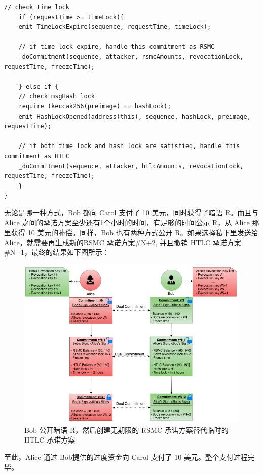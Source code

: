 \begin{lstlisting}[caption={兑现RSMC共同承诺}, label={lst:cashHtlc}]
    // check time lock
    if (requestTime >= timeLock){
    emit TimeLockExpire(sequence, requestTime, timeLock);
    
    // if time lock expire, handle this commitment as RSMC
    _doCommitment(sequence, attacker, rsmcAmounts, revocationLock, requestTime, freezeTime);
    
    } else if {
    // check msgHash lock
    require (keccak256(preimage) == hashLock);
    emit HashLockOpened(address(this), sequence, hashLock, preimage, requestTime);
    
    // if both time lock and hash lock are satisfied, handle this commitment as HTLC
    _doCommitment(sequence, attacker, htlcAmounts, revocationLock, requestTime, freezeTime);
    }
}

\end{lstlisting}

无论是哪一种方式，Bob 都向 Carol 支付了 10 美元，同时获得了暗语 R。而且与Alice 之间的承诺方案至少还有1个小时的时间，有足够的时间公示 R，从 Alice 那里获得 10 美元的补偿。同样，Bob 也有两种方式公开 R。如果选择私下里发送给 Alice，就需要再生成新的RSMC 承诺方案\#N+2, 并且撤销 HTLC 承诺方案\#N+1，最终的结果如下图所示：
\begin{figure}[h!]
    \centering
    \includegraphics[width=12cm, keepaspectratio]{../images/alice_bob_3.png}
    \caption{Bob 公开暗语 R，然后创建无期限的 RSMC 承诺方案替代临时的 HTLC 承诺方案}
    \label{fig:alice_bob_3}
\end{figure}

至此，Alice 通过 Bob提供的过度资金向 Carol 支付了 10 美元。整个支付过程完毕。
